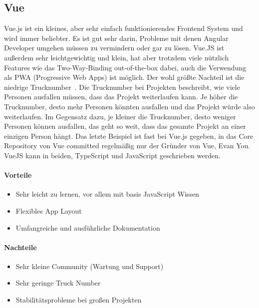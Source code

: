 \subsection{Vue}
\label{subsec:vue}
Vue.js ist ein kleines, aber sehr einfach funktionierendes Frontend System und wird immer beliebter.
Es ist gut sehr darin, Probleme mit denen Angular Developer umgehen müssen zu vermindern oder gar zu lösen.
Vue.JS ist außerdem sehr leichtgewichtig und klein, hat aber trotzdem viele nützlich Features wie das Two-Way-Binding
out-of-the-box dabei, auch die Verwendung als PWA (Progressive Web Apps) ist möglich.
Der wohl größte Nachteil ist die niedrige Trucknumber~\cite{truck-factor-of-popular-github-projects, what-is-the-bus-factor}.
Die Trucknumber bei Projekten beschreibt, wie viele Personen ausfallen müssen, dass das Projekt weiterlaufen kann.
Je höher die Trucknumber, desto mehr Personen könnten ausfallen und das Projekt würde also weiterlaufen.
Im Gegensatz dazu, je kleiner die Trucknumber, desto weniger Personen können ausfallen, das geht so weit, dass das gesamte
Projekt an einer einzigen Person hängt.
Das letzte Beispiel ist fast bei Vue.js gegeben, in das Core Repository von Vue committed regelmäßig nur der Gründer
von Vue, Evan You.
VueJS kann in beiden, TypeScript und JavaScript geschrieben werden.

\paragraph{Vorteile}
\begin{itemize}
    \item Sehr leicht zu lernen, vor allem mit basis JavaScript Wissen
    \item Flexibles App Layout
    \item Umfangreiche und ausführliche Dokumentation
\end{itemize}

\paragraph{Nachteile}
\begin{itemize}
    \item Sehr kleine Community (Wartung und Support)
    \item Sehr geringe Truck Number
    \item Stabilitätsprobleme bei großen Projekten
\end{itemize}

